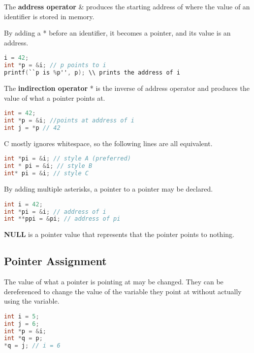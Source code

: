 \documentclass[english, 12pt]{article}
\begin{document}
\begin{defn}
The \textbf{address operator} \& produces the starting address of where the value of an identifier is stored in memory.
\end{defn}

\begin{defn}
By adding a * before an identifier, it becomes a pointer, and its value is an address.
\begin{lstlisting}[language=C]
i = 42;
int *p = &i; // p points to i
printf(``p is %p'', p); \\ prints the address of i
\end{lstlisting}
\end{defn}

\begin{defn}
The \textbf{indirection operator} * is the inverse of address operator and produces the value of what a pointer points at.
\begin{lstlisting}[language=C]
int = 42;
int *p = &i; //points at address of i
int j = *p // 42
\end{lstlisting}
\end{defn}
\begin{note}
C mostly ignores whitespace, so the following lines are all equivalent.
\begin{lstlisting}[language=C]
int *pi = &i; // style A (preferred)
int * pi = &i; // style B
int* pi = &i; // style C
\end{lstlisting}
\end{note}

\begin{defn}
By adding multiple asterisks, a pointer to a pointer may be declared.
\begin{lstlisting}[language=C]
int i = 42;
int *pi = &i; // address of i
int **ppi = &pi; // address of pi
\end{lstlisting}
\end{defn}

\begin{defn}
\textbf{NULL} is a pointer value that represents that the pointer points to nothing.
\end{defn}

\subsection{Pointer Assignment}
The value of what a pointer is pointing at may be changed. They can be dereferenced to change the value of the variable they point at without actually using the variable.
\begin{lstlisting}[language=C]
int i = 5;
int j = 6;
int *p = &i;
int *q = p;
*q = j; // i = 6
\end{lstlisting}
\end{document}
